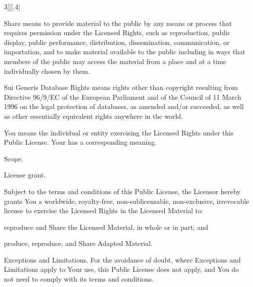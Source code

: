\documentclass[8pt,cleardoubleempty]{scrbook}
\begin{document}
\begin{multicols}{3}[][.4\paperwidth]
\begin{longenum}
\begin{longenum}
  \item Share means to provide material to the public by any means or
     process that requires permission under the Licensed Rights, such
     as reproduction, public display, public performance, distribution,
     dissemination, communication, or importation, and to make material
     available to the public including in ways that members of the
     public may access the material from a place and at a time
     individually chosen by them.

  \item Sui Generis Database Rights means rights other than copyright
     resulting from Directive 96/9/EC of the European Parliament and of
     the Council of 11 March 1996 on the legal protection of databases,
     as amended and/or succeeded, as well as other essentially
     equivalent rights anywhere in the world.

  \item You means the individual or entity exercising the Licensed Rights
     under this Public License. Your has a corresponding meaning.

  \end{longenum}

  \vfill

  \item Scope.

  \begin{longenum}
  \item License grant.

       \begin{longenum}

       \item Subject to the terms and conditions of this Public License,
          the Licensor hereby grants You a worldwide, royalty-free,
          non-sublicensable, non-exclusive, irrevocable license to
          exercise the Licensed Rights in the Licensed Material to:

            \begin{longenum}

            \item reproduce and Share the Licensed Material, in whole or
               in part; and

            \item produce, reproduce, and Share Adapted Material.

            \end{longenum}

       \item Exceptions and Limitations. For the avoidance of doubt, where
          Exceptions and Limitations apply to Your use, this Public
          License does not apply, and You do not need to comply with
          its terms and conditions.


\end{longenum}
\end{longenum}
\end{longenum}
\end{multicols}
\end{document}
